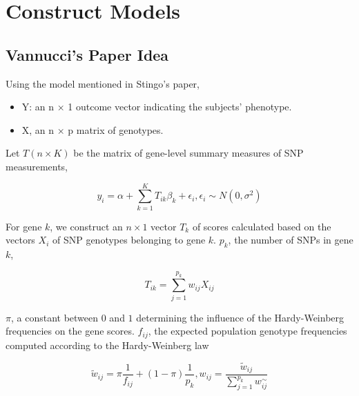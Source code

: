 \section{Construct Models}

\subsection{Vannucci's Paper Idea}


Using the model mentioned in Stingo's \citep{stingo2015bayesian} paper,


\begin{itemize}
   

\item Y: an n × 1 outcome vector indicating the subjects’ phenotype.
	
\item X, an n × p matrix of genotypes.
\end{itemize}


Let $T(n \times K)$ be the matrix of gene-level summary measures of SNP measurements,

\begin{equation}
y_{i}=\alpha + \sum_{k=1}^{K}T_{ik}\beta_{k} + \epsilon_{i},
\epsilon_{i} \sim N(0,\sigma^{2})
\end{equation}

For gene $k$, we construct an $n \times 1$ vector $T_{k}$ of scores calculated based on the vectors $X_{i}$ of SNP genotypes belonging to gene $k$. $p_{k}$, the number of SNPs in gene $k$,

\begin{equation}
T_{ik} = \sum_{j=1}^{p_{k}}w_{ij}X_{ij}
\end{equation}

$\pi$, a constant between $0$ and $1$ determining the influence of the Hardy-Weinberg frequencies on the gene scores.  $f_{ij}$, the expected population genotype frequencies computed according to the Hardy-Weinberg law

\begin{equation}
\tilde{w}_{ij} = \pi\frac{1}{f_{ij}} + (1 - \pi)\frac{1}{p_{k}}, 
w_{ij} = \frac
{\tilde{w}_{ij}}{\sum_{j=1}^{p_{k}}w_{ij}^{\sim}}
\end{equation}





